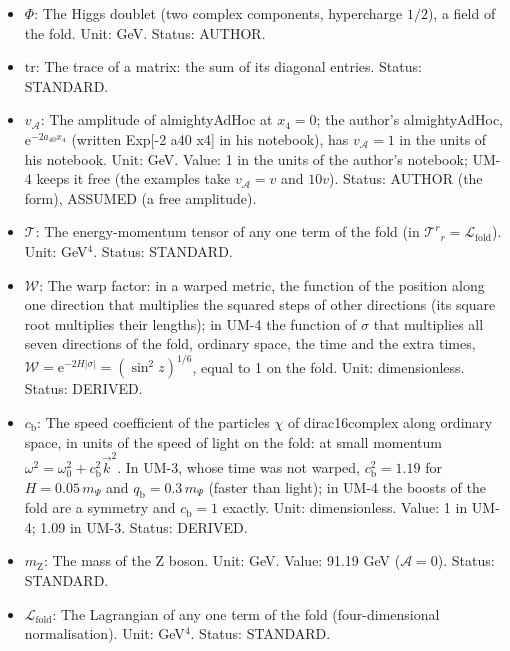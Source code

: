 \documentclass[
  10pt,
]{article}
\begin{document}
\begin{itemize}
\item
  \(\Phi\): The Higgs doublet (two complex components, hypercharge
  \(1/2\)), a field of the fold. Unit: GeV. Status: AUTHOR.
\item
  \(\mathrm{tr}\): The trace of a matrix: the sum of its diagonal
  entries. Status: STANDARD.
\item
  \(v_{\mathcal{A}}\): The amplitude of almightyAdHoc at \(x_4 = 0\);
  the author's almightyAdHoc, \(\mathrm{e}^{-2a_{40}x_4}\) (written
  Exp{[}-2 a40 x4{]} in his notebook), has \(v_{\mathcal{A}} = 1\) in
  the units of his notebook. Unit: GeV. Value: 1 in the units of the
  author's notebook; UM-4 keeps it free (the examples take
  \(v_{\mathcal{A}} = v\) and \(10v\)). Status: AUTHOR (the form),
  ASSUMED (a free amplitude).
\item
  \(\mathcal{T}\): The energy-momentum tensor of any one term of the
  fold (in \(\mathcal{T}^r{}_r = \mathcal{L}_{\mathrm{fold}}\)). Unit:
  GeV\(^4\). Status: STANDARD.
\item
  \(\mathcal{W}\): The warp factor: in a warped metric, the function of
  the position along one direction that multiplies the squared steps of
  other directions (its square root multiplies their lengths); in UM-4
  the function of \(\sigma\) that multiplies all seven directions of the
  fold, ordinary space, the time and the extra times,
  \(\mathcal{W} = \mathrm{e}^{-2H\lvert\sigma\rvert} = (\sin^2z)^{1/6}\),
  equal to 1 on the fold. Unit: dimensionless. Status: DERIVED.
\item
  \(c_{\mathrm{b}}\): The speed coefficient of the particles \(\chi\) of
  dirac16complex along ordinary space, in units of the speed of light on
  the fold: at small momentum
  \(\omega^2 = \omega_0^2 + c_{\mathrm{b}}^2\vec k^2\). In UM-3, whose
  time was not warped, \(c_{\mathrm{b}}^2 = 1.19\) for
  \(H = 0.05\,m_\Psi\) and \(q_{\mathrm{b}} = 0.3\,m_\Psi\) (faster than
  light); in UM-4 the boosts of the fold are a symmetry and
  \(c_{\mathrm{b}} = 1\) exactly. Unit: dimensionless. Value: 1 in UM-4;
  1.09 in UM-3. Status: DERIVED.
\item
  \(m_{\mathrm{Z}}\): The mass of the Z boson. Unit: GeV. Value: 91.19
  GeV (\(\mathcal{A} = 0\)). Status: STANDARD.
\item
  \(\mathcal{L}_{\mathrm{fold}}\): The Lagrangian of any one term of the
  fold (four-dimensional normalisation). Unit: GeV\(^4\). Status:
  STANDARD.
\end{itemize}
\end{document}
